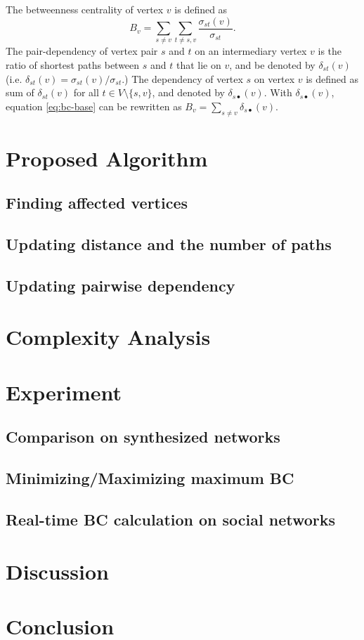 \documentclass{article}
\begin{document}
\begin{multicols*}{2}
  The betweenness centrality of vertex $v$ is defined as
  \begin{equation}
    B_{v}=\sum_{s\neq v}\sum_{t\neq s,v}\frac{\sigma_{st}(v)}{\sigma_{st}}.
    \label{eq:bc-base}
  \end{equation}
  The pair-dependency of vertex pair $s$ and $t$ on an intermediary vertex $v$ is the ratio of shortest paths between $s$ and $t$ that lie on $v$, and be denoted by $\delta_{st}(v)$ (i.e. $\delta_{st}(v)=\sigma_{st}(v)/\sigma_{st}$.)
  The dependency of vertex $s$ on vertex $v$ is defined as sum of $\delta_{st}(v)$ for all $t\in V\setminus\{s,v\}$, and denoted by $\delta_{s\bullet}(v)$.
  With $\delta_{s\bullet}(v)$, equation \eqref{eq:bc-base} can be rewritten as $B_{v}=\sum_{s\neq v}\delta_{s\bullet}(v)$.

  \section{Proposed Algorithm}
  \subsection{Finding affected vertices}
  \subsection{Updating distance and the number of paths}
  \subsection{Updating pairwise dependency}

  \section{Complexity Analysis}

  \section{Experiment}
  \subsection{Comparison on synthesized networks}
  \subsection{Minimizing/Maximizing maximum BC}
  \subsection{Real-time BC calculation on social networks}

  \section{Discussion}

  \section{Conclusion}

  \printbibliography[title=References]

\end{multicols*}
\end{document}
